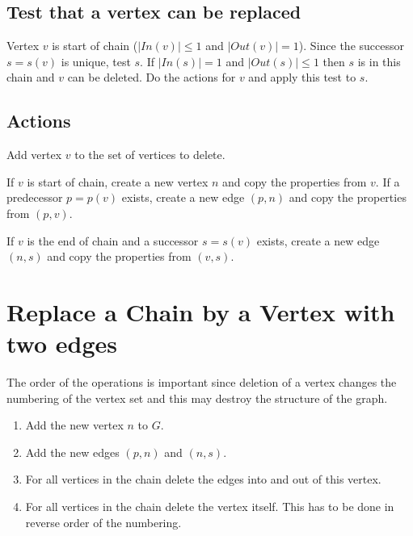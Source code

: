 \documentclass[12pt,a4paper]{report}
\begin{document}
\subsection{Test that a vertex can be replaced}
Vertex $v$ is start of chain ($|In(v)| \le 1$ and $|Out(v)| = 1$). Since the successor
$s = s(v)$ is unique, test $s$. If $|In(s)| = 1$ and $|Out(s)| \le 1$ then $s$
is in this chain and $v$ can be deleted. Do the actions for $v$ and apply
this test to $s$.

\subsection{Actions}
Add vertex $v$ to the set of vertices to delete.

If $v$ is start of chain, create a new vertex $n$ and copy the properties from $v$.
If a predecessor $p = p(v)$ exists, create a new edge $(p,n)$ and copy
the properties from $(p,v)$.

If $v$ is the end of chain and a successor $s = s(v)$ exists, create a
new edge $(n,s)$ and copy the properties from $(v,s)$.

\section{Replace a Chain by a Vertex with two edges}
The order of the operations is important since deletion of a vertex changes
the numbering of the vertex set and this may destroy the structure of the graph.

\begin{enumerate}
\item Add the new vertex $n$ to $G$.
\item Add the new edges $(p,n)$ and $(n,s)$.
\item For all vertices in the chain delete the edges into and out of this vertex.
\item For all vertices in the chain delete the vertex itself. This has to be done
in reverse order of the numbering.
\end{enumerate}
\end{document}
